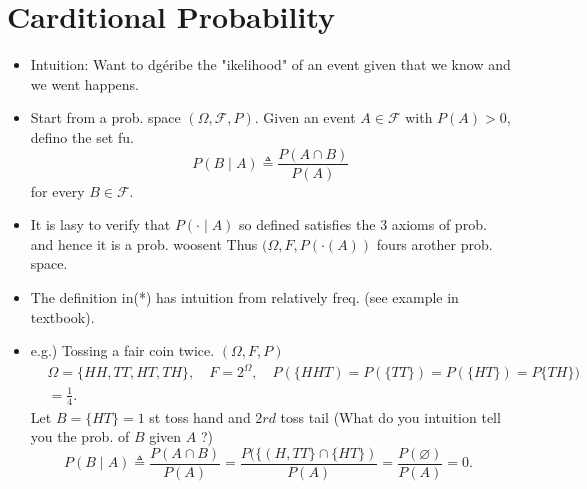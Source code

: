\documentclass[10pt]{article}
\begin{document}
\section*{Carditional Probability}
\begin{itemize}
  \item[-] Intuition: Want to dgéribe the "ikelihood" of an event given that we know and we went happens.
  \item[-] Start from a prob. space \((\Omega, \mathcal{F}, P)\). Given an event \(A \in \mathcal{F}\) with \(P(A)>0\), defino the set fu.
\[
P(B \mid A) \triangleq \frac{P(A \cap B)}{P(A)}
\]
for every \(B \in \mathscr{F}\).
  \item[-] It is lasy to verify that \(P(\cdot \mid A)\) so defined satisfies the 3 axioms of prob. and hence it is a prob. woosent Thus \((\Omega, F, P(\cdot(A))\) fours arother prob. space.
  \item[-] The definition in(*) has intuition from relatively freq. (see example in textbook).
  \item[-] e.g.) Tossing a fair coin twice. \((\Omega, F, P)\)
\[
\begin{aligned}
& \Omega=\{H H, T T, H T, T H\}, \quad F=2^{\Omega}, \quad P(\{H H T)=P(\{T T\})=P(\{H T\})=P\{T H\}) \\
&=\frac{1}{4} .
\end{aligned}
\]
Let \(B=\{H T\}=1\) st toss hand and \(2 r d\) toss tail (What do you intuition tell you the prob. of \(B\) given \(A\) ?)
\[
P(B \mid A) \triangleq \frac{P(A \cap B)}{P(A)}=\frac{P(\{(H, T T\} \cap\{H T\})}{P(A)}=\frac{P(\varnothing)}{P(A)}=0 \text {. }
\]
\end{itemize}
\end{document}
